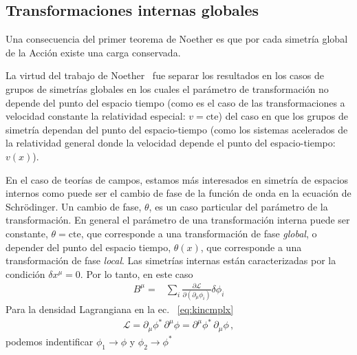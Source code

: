 \subsection{Transformaciones internas globales}

Una consecuencia del primer teorema de Noether es que por cada simetría global de la Acción existe una carga conservada. 




La virtud del trabajo de Noether~\cite{Noether,Brading:2000hc,Brading:2003nv,Sundermeyer:2014kha} fue separar los resultados  en los casos de grupos de simetrías globales en los cuales el parámetro de transformación no depende del punto del espacio tiempo (como es el caso de las transformaciones a velocidad constante la relatividad especial: $v=\text{cte}$) del caso en que los grupos de simetría dependan del punto del espacio-tiempo (como los sistemas acelerados de la relatividad general donde la velocidad depende el punto del espacio-tiempo: $v(x)$).

En el caso de teorías de campos, estamos más interesados en simetría de espacios internos como puede ser el cambio de fase de la función de onda en la ecuación de Schrödinger. Un cambio de fase, $\theta$, es un caso particular del parámetro de la transformación. En general el parámetro de una transformación interna puede ser constante, $\theta=\text{cte}$, que corresponde a una transformación de fase  \emph{global}, o depender del punto del espacio tiempo, $\theta(x)$, que corresponde  a una transformación  de fase \emph{local}. Las simetrías internas están caracterizadas por la condición $\delta x^\mu=0$. Por lo tanto, en este caso
\begin{align}
  B^{\mu}=&\sum_i \frac{\partial\mathcal{L}}{\partial(\partial_{\mu}\phi_i)}\delta\phi_{i}
\end{align}
Para la densidad Lagrangiana en la ec.~ \eqref{eq:kincmplx}
\begin{align}
  \label{eq:t1noetherint}
    \mathcal{L} =  {\partial_\mu\phi^{*}}\,{\partial^\mu\phi} = {\partial^\mu\phi^{*}}\,{\partial_\mu\phi}\,,
\end{align}
podemos indentificar $\phi_1 \to \phi$ y $\phi_2 \to \phi^*$ 

